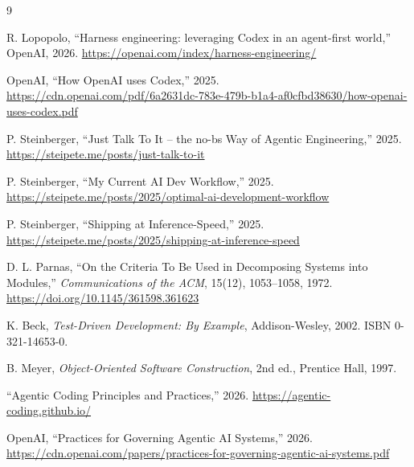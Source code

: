 \documentclass[11pt]{article}
\begin{document}
\begin{thebibliography}{9}

R. Lopopolo, ``Harness engineering: leveraging Codex in an agent-first world,''
OpenAI, 2026.
\url{https://openai.com/index/harness-engineering/}

OpenAI, ``How OpenAI uses Codex,'' 2025.
\url{https://cdn.openai.com/pdf/6a2631dc-783e-479b-b1a4-af0cfbd38630/how-openai-uses-codex.pdf}

P. Steinberger, ``Just Talk To It -- the no-bs Way of Agentic Engineering,''
2025.
\url{https://steipete.me/posts/just-talk-to-it}

P. Steinberger, ``My Current AI Dev Workflow,'' 2025.
\url{https://steipete.me/posts/2025/optimal-ai-development-workflow}

P. Steinberger, ``Shipping at Inference-Speed,'' 2025.
\url{https://steipete.me/posts/2025/shipping-at-inference-speed}

D. L. Parnas, ``On the Criteria To Be Used in Decomposing Systems into
Modules,'' \emph{Communications of the ACM}, 15(12), 1053--1058, 1972.
\url{https://doi.org/10.1145/361598.361623}

K. Beck, \emph{Test-Driven Development: By Example}, Addison-Wesley, 2002.
ISBN 0-321-14653-0.

B. Meyer, \emph{Object-Oriented Software Construction}, 2nd ed.,
Prentice Hall, 1997.

``Agentic Coding Principles and Practices,'' 2026.
\url{https://agentic-coding.github.io/}

OpenAI, ``Practices for Governing Agentic AI Systems,'' 2026.
\url{https://cdn.openai.com/papers/practices-for-governing-agentic-ai-systems.pdf}

\end{thebibliography}
\end{document}

